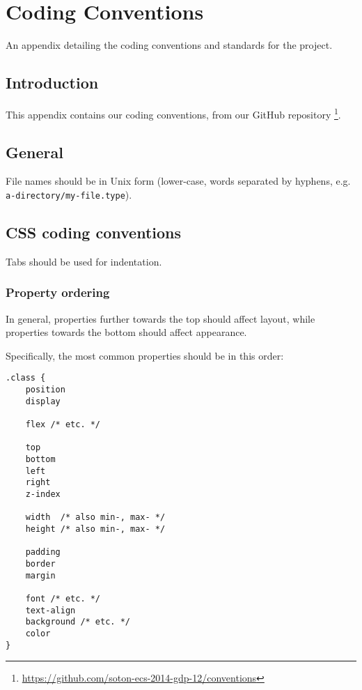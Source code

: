 \chapter{Coding Conventions} \label{App:Coding Conventions}

\begin{preamble}
	An appendix detailing the coding conventions and standards for the project.
\end{preamble}

\section{Introduction}

This appendix contains our coding conventions, from our GitHub repository
\footnote{\url{https://github.com/soton-ecs-2014-gdp-12/conventions}}.

\section{General}

File names should be in Unix form (lower-case, words separated by
hyphens, e.g. \texttt{a-directory/my-file.type}).

\section{CSS coding conventions}

Tabs should be used for indentation.

\subsection{Property ordering}

In general, properties further towards the top should affect layout,
while properties towards the bottom should affect appearance.

Specifically, the most common properties should be in this order:

\begin{lstlisting}
.class {
	position
	display

	flex /* etc. */

	top
	bottom
	left
	right
	z-index

	width  /* also min-, max- */
	height /* also min-, max- */

	padding
	border
	margin

	font /* etc. */
	text-align
	background /* etc. */
	color
}
\end{lstlisting}

